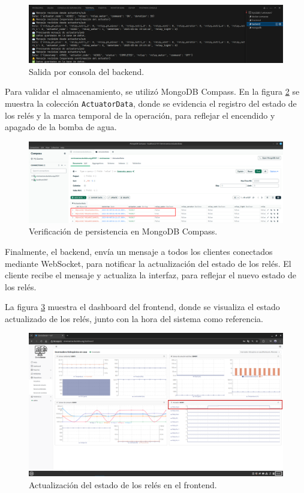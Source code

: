 \begin{figure}[H]
    \centering
    \includegraphics[width=\textwidth]{Images/59_prueba_integral_5.png}
    \caption[Salida por consola del backend]{Salida por consola del backend.}
    \label{fig:prueba_integral_5}
\end{figure}

Para validar el almacenamiento, se utilizó MongoDB Compass. En la figura
\ref{fig:prueba_integral_6} se muestra la colección \texttt{ActuatorData},
donde se evidencia el registro del estado de los relés y la marca temporal de
la operación, para reflejar el encendido y apagado de la bomba de agua.

\begin{figure}[H]
    \centering
    \includegraphics[width=\textwidth]{Images/59_prueba_integral_6.png}
    \caption[Verificación de persistencia en MongoDB Compass]{Verificación de persistencia en MongoDB Compass.}
    \label{fig:prueba_integral_6}
\end{figure}

Finalmente, el backend, envía un mensaje a todos los clientes conectados
mediante WebSocket, para notificar la actualización del estado de los relés. El
cliente recibe el mensaje y actualiza la interfaz, para reflejar el nuevo
estado de los relés.

La figura \ref{fig:prueba_integral_7} muestra el dashboard del frontend, donde
se visualiza el estado actualizado de los relés, junto con la hora del sistema
como referencia.

\begin{figure}[H]
    \centering
    \includegraphics[width=\textwidth]{Images/59_prueba_integral_7.png}
    \caption[Actualización del estado de los relés en el frontend]{Actualización del estado de los relés en el frontend.}
    \label{fig:prueba_integral_7}
\end{figure}
